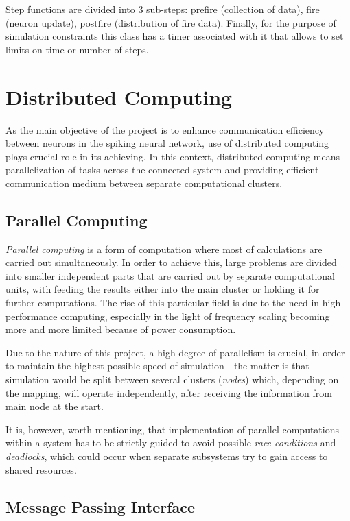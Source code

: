 Step functions are divided into 3 sub-steps: prefire (collection of data), fire (neuron update), postfire (distribution of fire data).
Finally, for the purpose of simulation constraints this class has a timer associated with it that allows to set limits on time or number of steps.
\section{Distributed Computing}

As the main objective of the project is to enhance communication efficiency between neurons in the spiking neural network, use of distributed computing plays crucial
role in its achieving. In this context, distributed computing means parallelization of tasks across the connected system and providing efficient communication medium
between separate computational clusters.

\subsection{Parallel Computing}

\emph{Parallel computing} is a form of computation where most of calculations are carried out simultaneously.\cite{G.S.Almasi1989} In order to achieve this, large problems
are divided into smaller independent parts that are carried out by separate computational units, with feeding the results either into the main cluster or holding it for further
computations. The rise of this particular field is due to the need in high-performance computing, especially in the light of frequency scaling becoming more and more
limited because of power consumption.\cite{Kumar2002}

Due to the nature of this project, a high degree of parallelism is crucial, in order to maintain the highest possible speed of simulation - the matter is that simulation would
be split between several clusters (\emph{nodes}) which, depending on the mapping, will operate independently, after receiving the information from main node at the start.

It is, however, worth mentioning, that implementation of parallel computations within a system has to be strictly guided to avoid possible \emph{race conditions} and \emph{deadlocks}, which
could occur when separate subsystems try to gain access to shared resources.

\subsection{Message Passing Interface}

